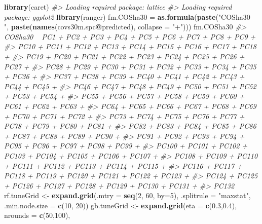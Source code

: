 \documentclass[graybox,natbib,nospthms,UStrade]{svmono}
\newenvironment{Shaded}{\begin{snugshade}}{\end{snugshade}}
\newcommand{\CommentTok}[1]{\textcolor[rgb]{0.37,0.37,0.37}{\textit{#1}}}
\newcommand{\DataTypeTok}[1]{\textcolor[rgb]{0.27,0.27,0.27}{#1}}
\newcommand{\DecValTok}[1]{\textcolor[rgb]{0.06,0.06,0.06}{#1}}
\newcommand{\FloatTok}[1]{\textcolor[rgb]{0.06,0.06,0.06}{#1}}
\newcommand{\KeywordTok}[1]{\textcolor[rgb]{0.27,0.27,0.27}{\textbf{#1}}}
\newcommand{\NormalTok}[1]{#1}
\newcommand{\OperatorTok}[1]{\textcolor[rgb]{0.43,0.43,0.43}{\textbf{#1}}}
\newcommand{\StringTok}[1]{\textcolor[rgb]{0.5,0.5,0.5}{#1}}
\begin{document}
\begin{Shaded}
\begin{Highlighting}[]
\KeywordTok{library}\NormalTok{(caret)}
\CommentTok{#> Loading required package: lattice}
\CommentTok{#> Loading required package: ggplot2}
\KeywordTok{library}\NormalTok{(ranger)}
\NormalTok{fm.COSha30 =}\StringTok{ }\KeywordTok{as.formula}\NormalTok{(}\KeywordTok{paste}\NormalTok{(}\StringTok{"COSha30 ~ "}\NormalTok{, }\KeywordTok{paste}\NormalTok{(}\KeywordTok{names}\NormalTok{(covs30m.spc}\OperatorTok{@}\NormalTok{predicted), }\DataTypeTok{collapse =} \StringTok{"+"}\NormalTok{)))}
\NormalTok{fm.COSha30}
\CommentTok{#> COSha30 ~ PC1 + PC2 + PC3 + PC4 + PC5 + PC6 + PC7 + PC8 + PC9 + }
\CommentTok{#>     PC10 + PC11 + PC12 + PC13 + PC14 + PC15 + PC16 + PC17 + PC18 + }
\CommentTok{#>     PC19 + PC20 + PC21 + PC22 + PC23 + PC24 + PC25 + PC26 + PC27 + }
\CommentTok{#>     PC28 + PC29 + PC30 + PC31 + PC32 + PC33 + PC34 + PC35 + PC36 + }
\CommentTok{#>     PC37 + PC38 + PC39 + PC40 + PC41 + PC42 + PC43 + PC44 + PC45 + }
\CommentTok{#>     PC46 + PC47 + PC48 + PC49 + PC50 + PC51 + PC52 + PC53 + PC54 + }
\CommentTok{#>     PC55 + PC56 + PC57 + PC58 + PC59 + PC60 + PC61 + PC62 + PC63 + }
\CommentTok{#>     PC64 + PC65 + PC66 + PC67 + PC68 + PC69 + PC70 + PC71 + PC72 + }
\CommentTok{#>     PC73 + PC74 + PC75 + PC76 + PC77 + PC78 + PC79 + PC80 + PC81 + }
\CommentTok{#>     PC82 + PC83 + PC84 + PC85 + PC86 + PC87 + PC88 + PC89 + PC90 + }
\CommentTok{#>     PC91 + PC92 + PC93 + PC94 + PC95 + PC96 + PC97 + PC98 + PC99 + }
\CommentTok{#>     PC100 + PC101 + PC102 + PC103 + PC104 + PC105 + PC106 + PC107 + }
\CommentTok{#>     PC108 + PC109 + PC110 + PC111 + PC112 + PC113 + PC114 + PC115 + }
\CommentTok{#>     PC116 + PC117 + PC118 + PC119 + PC120 + PC121 + PC122 + PC123 + }
\CommentTok{#>     PC124 + PC125 + PC126 + PC127 + PC128 + PC129 + PC130 + PC131 + }
\CommentTok{#>     PC132}
\NormalTok{rf.tuneGrid <-}\StringTok{ }\KeywordTok{expand.grid}\NormalTok{(}\DataTypeTok{.mtry =} \KeywordTok{seq}\NormalTok{(}\DecValTok{2}\NormalTok{, }\DecValTok{60}\NormalTok{, }\DataTypeTok{by=}\DecValTok{5}\NormalTok{),}
                           \DataTypeTok{.splitrule =} \StringTok{"maxstat"}\NormalTok{,}
                           \DataTypeTok{.min.node.size =} \KeywordTok{c}\NormalTok{(}\DecValTok{10}\NormalTok{, }\DecValTok{20}\NormalTok{))}
\NormalTok{gb.tuneGrid <-}\StringTok{ }\KeywordTok{expand.grid}\NormalTok{(}\DataTypeTok{eta =} \KeywordTok{c}\NormalTok{(}\FloatTok{0.3}\NormalTok{,}\FloatTok{0.4}\NormalTok{), }
                           \DataTypeTok{nrounds =} \KeywordTok{c}\NormalTok{(}\DecValTok{50}\NormalTok{,}\DecValTok{100}\NormalTok{), }

\end{Highlighting}
\end{Shaded}
\end{document}
